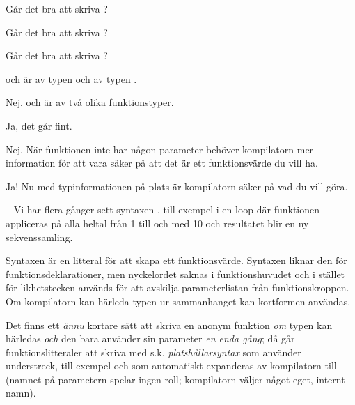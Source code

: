 \Subtask Går det bra att skriva ?

\Subtask Går det bra att skriva ?

\Subtask Går det bra att skriva ?

\SOLUTION

\TaskSolved \what

\SubtaskSolved

\begin{ConceptConnections}
  
\end{ConceptConnections}

\SubtaskSolved {} och  är av typen  och  av typen .

\SubtaskSolved  Nej.  och  är av två olika funktionstyper.

\SubtaskSolved  Ja, det går fint.

\SubtaskSolved  Nej. När funktionen inte har någon parameter behöver kompilatorn mer information för att vara säker på att det är ett funktionsvärde du vill ha.

\SubtaskSolved Ja! Nu med typinformationen på plats är kompilatorn säker på vad du vill göra.

\QUESTEND





\QUESTBEGIN

\Task  \what~  Vi har flera gånger sett syntaxen , till exempel i en loop  där funktionen  appliceras på alla heltal från 1 till och med 10 och resultatet blir en ny sekvenssamling.

Syntaxen  är en litteral för att skapa ett funktionsvärde. Syntaxen liknar den för funktionsdeklarationer, men nyckelordet  saknas i funktionshuvudet och i stället för likhetstecken används \code{=>} för att avskilja parameterlistan från funktionskroppen.
Om kompilatorn kan härleda typen ur sammanhanget kan kortformen  användas.

Det finns ett \emph{ännu} kortare sätt att skriva en anonym funktion \emph{om} typen kan härledas \emph{och} den bara använder sin parameter \emph{en enda gång}; då går funktionslitteraler att skriva med s.k. \emph{platshållarsyntax} som använder understreck, till exempel  och som automatiskt expanderas av kompilatorn till  (namnet på parametern spelar ingen roll; kompilatorn väljer något eget, internt namn).

